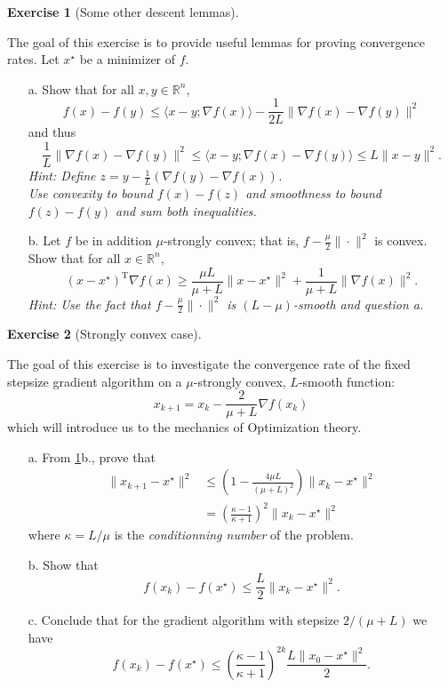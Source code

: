 \documentclass[a4paper,twoside,10pt]{amsart}
\numberwithin{equation}{section} %
\numberwithin{figure}{section} %
\numberwithin{table}{section} %
\theoremstyle{definition}
\newtheorem{q_td}{Exercise }
\begin{document}
\begin{q_td}[Some other descent lemmas] \label{td:descent2} \hfill

The goal of this exercise is to provide useful lemmas for proving convergence rates.  Let $x^\star$ be a minimizer of $f$.
\begin{itemize}
\item[a.]  Show that for all $x,y\in\mathbb{R}^n$,
$$ f(x) - f(y) \leq  \langle x- y ;  \nabla f(x) \rangle  - \frac{1}{2L} \|  \nabla f(x) - \nabla f(y)  \|^2 $$
and thus $$  \frac{1}{L}  \|  \nabla f(x) - \nabla f(y)  \|^2 \leq  \langle x- y ;  \nabla f(x) - \nabla f(y) \rangle  \leq   L \|x-y\|^2 .$$ 
\emph{Hint: Define $z=y - \frac{1}{L}(\nabla f(y)  -  \nabla f(x) )  $.\\ Use convexity to bound $f(x)-f(z)$ and smoothness to bound $f(z) - f(y)$ and sum both inequalities.}
\item[b.] Let $f$ be in addition $\mu$-strongly convex; that is, $f-\frac{\mu}{2}\|\cdot\|^2 $ is convex. Show that for all $x\in\mathbb{R}^n$,
$$ (x-x^\star)^\mathrm{T} \nabla f(x) \geq  \frac{\mu L}{\mu + L} \|x-x^\star\|^2 +  \frac{1}{\mu + L} \|\nabla f(x)\|^2 .$$
\emph{Hint: Use the fact that $f-\frac{\mu}{2}\|\cdot\|^2 $ is $(L-\mu)$-smooth and question a. }
\end{itemize}
\end{q_td}



\vspace*{0.5cm}


\begin{q_td}[Strongly convex case]\label{td:str}\hfill


The goal of this exercise is to investigate the convergence rate of the fixed stepsize gradient algorithm on a $\mu$-strongly convex, $L$-smooth function:
$$ x_{k+1} = x_k - \frac{2}{\mu+L} \nabla f(x_k)$$
which will introduce us to the mechanics of Optimization theory.
\begin{itemize}
\item[a.]  From \ref{td:descent2}b., prove that
\begin{align*}
 \|x_{k+1} - x^\star \|^2 &\leq \left( 1 - \frac{4\mu L}{(\mu+L)^2}\right) \|x_k - x^\star \|^2  \\
&=  \left( \frac{\kappa - 1}{ \kappa+1}\right)^2 \|x_k - x^\star \|^2 
\end{align*}
where $\kappa=L/\mu$ is the \emph{conditionning number} of the problem.
\item[b.]  Show that 
$$ f(x_k) - f(x^\star) \leq \frac{L}{2} \|x_k - x^\star \|^2 .$$
\item[c.]  Conclude that for the gradient algorithm with stepsize ${2}/{(\mu+L)}$ we have 
$$ f(x_k) - f(x^\star) \leq \left( \frac{\kappa - 1}{ \kappa+1}\right)^{2k}   \frac{L\|x_0 - x^\star \|^2}{2}   . $$
\end{itemize}
\end{q_td}
\end{document}
